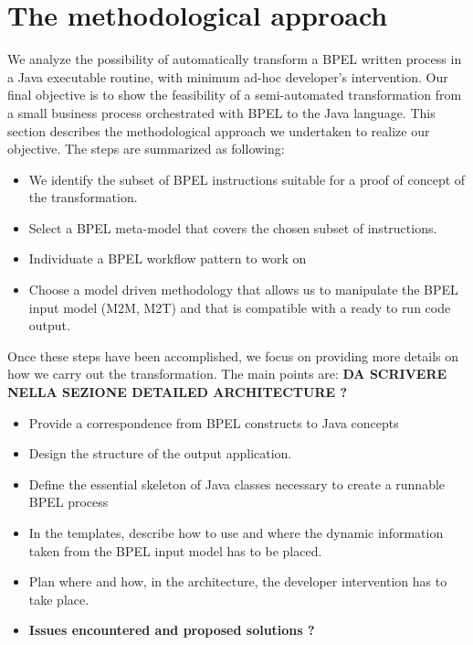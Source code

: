 \section{The methodological approach}
\label{MethodApproach}

We analyze the possibility of automatically transform a BPEL written process in a Java executable routine, with minimum ad-hoc developer’s intervention. Our final objective is to show the feasibility of a semi-automated transformation from a small business process orchestrated with BPEL to the Java language.
This section describes the methodological approach we undertaken to realize our objective. The steps are summarized as following:

\begin{itemize}
 \item We identify the subset of BPEL instructions suitable for a proof of concept of the transformation.
 \item Select a BPEL meta-model that covers the chosen subset of instructions.
 \item Individuate a BPEL workflow pattern to work on
 \item Choose a model driven methodology that allows us to manipulate  the BPEL input model (M2M, M2T) and that is compatible with a ready to run code output.
\end{itemize} 

Once these steps have been accomplished, we focus on providing more details on how we carry out the transformation. The main points are:
\textbf{DA SCRIVERE NELLA SEZIONE DETAILED ARCHITECTURE ? }
\begin{itemize}
 \item Provide a correspondence from BPEL constructs to Java concepts
 \item Design the structure of the output application.
 \item Define the essential skeleton of Java classes necessary to create a runnable BPEL process
 \item In the templates, describe how to use and where the dynamic information taken from the BPEL input model has to be placed.
 \item Plan where and how, in the architecture, the developer intervention has to take place.
 \item \textbf{Issues encountered and proposed solutions  ? }
\end{itemize} 
 
